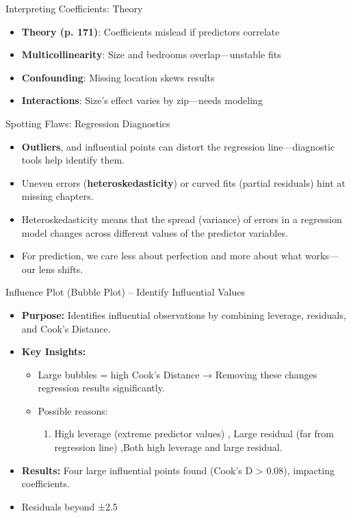 \documentclass{beamer}
\begin{document}
	\begin{frame}{Interpreting Coefficients: Theory}
		\begin{itemize}
			\item \textbf{Theory (p. 171)}: Coefficients mislead if predictors correlate
			\item \textbf{Multicollinearity}: Size and bedrooms overlap—unstable fits
			\item \textbf{Confounding}: Missing location skews results
			\item \textbf{Interactions}: Size’s effect varies by zip—needs modeling
		\end{itemize}
	\end{frame}
	
	\begin{frame}{Spotting Flaws: Regression Diagnostics}
		\begin{itemize}
			\item \textbf{Outliers}, and influential points can distort the regression line—diagnostic tools help identify them.
			\item Uneven errors (\textbf{heteroskedasticity}) or curved fits (partial residuals) hint at missing chapters.
			\item Heteroskedasticity means that the spread (variance) of errors in a regression model changes across different values of the predictor variables.
			\item For prediction, we care less about perfection and more about what works—our lens shifts.
		\end{itemize}
	\end{frame}
		

	
	\begin{frame}[fragile]{Influence Plot (Bubble Plot) – Identify Influential Values}
		\begin{itemize}
			\item \textbf{Purpose:} Identifies influential observations by combining leverage, residuals, and Cook’s Distance.
			\item \textbf{Key Insights:}
			\begin{itemize}
				\item Large bubbles = high Cook’s Distance → Removing these changes regression results significantly.
				\item Possible reasons:
				\begin{enumerate}
					\item High leverage (extreme predictor values) , Large residual (far from regression line) ,Both high leverage and large residual.
				\end{enumerate}
			\end{itemize}
			\item \textbf{Results:} Four large influential points found (Cook’s D > 0.08), impacting coefficients.
			\item Residuals beyond ±2.5
		\end{itemize}
		

	\end{frame}
	
\end{document}

